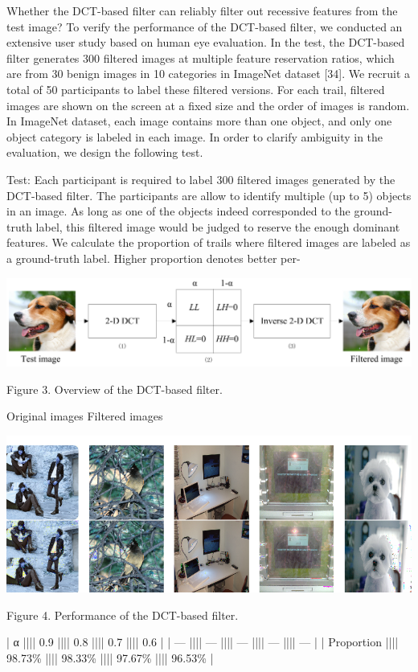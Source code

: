 \documentclass{article}
\begin{document}
Whether the DCT-based filter can reliably filter out recessive features from the test image? To verify the performance of the DCT-based filter, we conducted an extensive user study based on human eye evaluation. In the test, the DCT-based filter generates 300 filtered images at multiple feature reservation ratios, which are from 30 benign images in 10 categories in ImageNet dataset [34]. We recruit a total of 50 participants to label these filtered versions. For each trail, filtered images are shown on the screen at a fixed size and the order of images is random. In ImageNet dataset, each image contains more than one object, and only one object category is labeled in each image. In order to clarify ambiguity in the evaluation, we design the following test.

Test: Each participant is required to label 300 filtered images generated by the DCT-based filter. The participants are allow to identify multiple (up to 5) objects in an image. As long as one of the objects indeed corresponded to the ground-truth label, this filtered image would be judged to reserve the enough dominant features. We calculate the proportion of trails where filtered images are labeled as a ground-truth label. Higher proportion denotes better per-


\includegraphics{_page_5_Figure_0.png}


Figure 3. Overview of the DCT-based filter.

Original images Filtered images


\includegraphics{_page_5_Figure_3.png}


Figure 4. Performance of the DCT-based filter.

| α          |||| 0.9    |||| 0.8    |||| 0.7    |||| 0.6    |
| ---        |||| ---    |||| ---    |||| ---    |||| ---    |
| Proportion |||| 98.73\% |||| 98.33\% |||| 97.67\% |||| 96.53\% |
\end{document}
